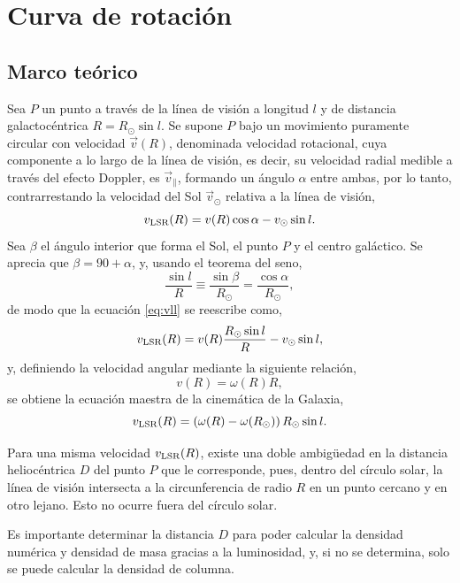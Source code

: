\section{Curva de rotación}

\subsection{Marco teórico}

Sea $P$ un punto a través de la línea de visión a longitud $l$ y de distancia galactocéntrica $R=R_\odot\sin l$. Se supone $P$ bajo un movimiento puramente circular con velocidad $\vec{v}(R)$, denominada velocidad rotacional, cuya componente a lo largo de la línea de visión, es decir, su velocidad radial medible a través del efecto Doppler, es $\vec{v}_\parallel$, formando un ángulo $\alpha$ entre ambas, por lo tanto, contrarrestando la velocidad del Sol $\vec{v}_\odot$ relativa a la línea de visión,
\begin{equation}
v_\textnormal{LSR}(R)=v(R)\cos\alpha-v_\odot\sin l
.\label{eq:vll}\end{equation}
Sea $\beta$ el ángulo interior que forma el Sol, el punto $P$ y el centro galáctico. Se aprecia que $\beta=90+\alpha$, y, usando el teorema del seno,
\begin{equation}
\frac{\sin l}{R}\equiv\frac{\sin\beta}{R_\odot}=\frac{\cos\alpha}{R_\odot}
,\end{equation}
de modo que la ecuación \ref{eq:vll} se reescribe como,
\begin{equation}
v_\textnormal{LSR}(R)=v(R)\frac{R_\odot\sin l}{R}-v_\odot\sin l
,\label{eq:nomaestra}
\end{equation}
y, definiendo la velocidad angular mediante la siguiente relación,
\begin{equation}
v(R)=\omega(R)R
,\end{equation}
se obtiene la ecuación maestra de la cinemática de la Galaxia,
\begin{equation}
v_\textnormal{LSR}(R)=\left(\omega(R)-\omega(R_\odot)\right)R_\odot\sin l
.\label{eq:maestra}\end{equation}

Para una misma velocidad $v_\textnormal{LSR}(R)$, existe una doble ambigüedad en la distancia heliocéntrica $D$ del punto $P$ que le corresponde, pues, dentro del círculo solar, la línea de visión intersecta a la circunferencia de radio $R$ en un punto cercano y en otro lejano. Esto no ocurre fuera del círculo solar.

Es importante determinar la distancia $D$ para poder calcular la densidad numérica y densidad de masa gracias a la luminosidad, y, si no se determina, solo se puede calcular la densidad de columna.

